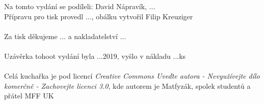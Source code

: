 \tableofcontents
{}
\vspace*{\fill}
Na tomto vydání se podíleli: David Nápravík, ... \\
Přípravu pro tisk provedl ..., obálku vytvořil Filip Kreuziger\\
\\
Za tisk děkujeme ... a nakladatelství ... \\
\\
Uzávěrka tohoot vydání byla ...2019, vyšlo v nákladu ...ks \\
\\
Celá kuchařka je pod licencí \textit{Creative Commons Uveďte autora - Nevyužívejte dílo komerčně - Zachovejte licenci 3.0}, kde autorem je Matfyzák, spolek studentů a přátel MFF UK

